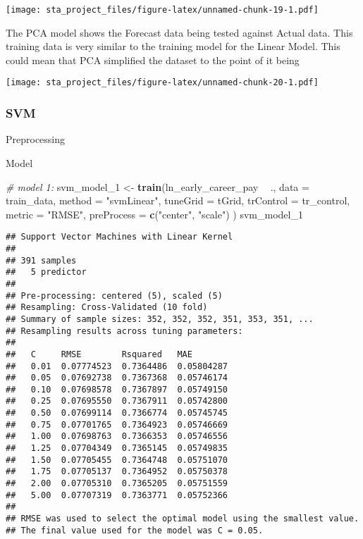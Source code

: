 \documentclass[
]{article}
\newenvironment{Shaded}{\begin{snugshade}}{\end{snugshade}}
\newcommand{\CommentTok}[1]{\textcolor[rgb]{0.56,0.35,0.01}{\textit{#1}}}
\newcommand{\DataTypeTok}[1]{\textcolor[rgb]{0.13,0.29,0.53}{#1}}
\newcommand{\DecValTok}[1]{\textcolor[rgb]{0.00,0.00,0.81}{#1}}
\newcommand{\KeywordTok}[1]{\textcolor[rgb]{0.13,0.29,0.53}{\textbf{#1}}}
\newcommand{\NormalTok}[1]{#1}
\newcommand{\OperatorTok}[1]{\textcolor[rgb]{0.81,0.36,0.00}{\textbf{#1}}}
\newcommand{\StringTok}[1]{\textcolor[rgb]{0.31,0.60,0.02}{#1}}
\begin{document}
\texttt{[image: sta\_project\_files/figure-latex/unnamed-chunk-19-1.pdf]}

The PCA model shows the Forecast data being tested against Actual data.
This training data is very similar to the training model for the Linear
Model. This could mean that PCA simplified the dataset to the point of
it being

\texttt{[image: sta\_project\_files/figure-latex/unnamed-chunk-20-1.pdf]}

\hypertarget{svm}{%
\subsubsection{SVM}\label{svm}}

Preprocessing

Model

\begin{Shaded}
\begin{Highlighting}[]
\CommentTok{# model 1:}
\NormalTok{svm_model_}\DecValTok{1}\NormalTok{ <-}\StringTok{ }\KeywordTok{train}\NormalTok{(ln_early_career_pay }\OperatorTok{~}\StringTok{ }\NormalTok{.,}
  \DataTypeTok{data =}\NormalTok{ train_data, }
  \DataTypeTok{method =} \StringTok{"svmLinear"}\NormalTok{,}
  \DataTypeTok{tuneGrid =}\NormalTok{ tGrid, }
  \DataTypeTok{trControl =}\NormalTok{ tr_control, }
  \DataTypeTok{metric =} \StringTok{"RMSE"}\NormalTok{,}
  \DataTypeTok{preProcess =} \KeywordTok{c}\NormalTok{(}\StringTok{"center"}\NormalTok{, }\StringTok{"scale"}\NormalTok{)}
\NormalTok{)}
\NormalTok{svm_model_}\DecValTok{1}
\end{Highlighting}
\end{Shaded}

\begin{verbatim}
## Support Vector Machines with Linear Kernel 
## 
## 391 samples
##   5 predictor
## 
## Pre-processing: centered (5), scaled (5) 
## Resampling: Cross-Validated (10 fold) 
## Summary of sample sizes: 352, 352, 352, 351, 353, 351, ... 
## Resampling results across tuning parameters:
## 
##   C     RMSE        Rsquared   MAE       
##   0.01  0.07774523  0.7364486  0.05804287
##   0.05  0.07692738  0.7367368  0.05746174
##   0.10  0.07698578  0.7367897  0.05749150
##   0.25  0.07695550  0.7367911  0.05742800
##   0.50  0.07699114  0.7366774  0.05745745
##   0.75  0.07701765  0.7364923  0.05746669
##   1.00  0.07698763  0.7366353  0.05746556
##   1.25  0.07704349  0.7365145  0.05749835
##   1.50  0.07705455  0.7364748  0.05751070
##   1.75  0.07705137  0.7364952  0.05750378
##   2.00  0.07705310  0.7365205  0.05751559
##   5.00  0.07707319  0.7363771  0.05752366
## 
## RMSE was used to select the optimal model using the smallest value.
## The final value used for the model was C = 0.05.
\end{verbatim}
\end{document}
